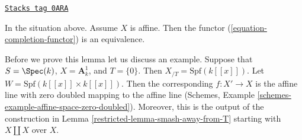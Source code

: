 \begin{lemma}
\label{restricted-lemma-dilatations-affine}
\href{https://stacks.math.columbia.edu/tag/0ARA}{\texttt{Stacks tag 0ARA}}

In the situation above. Assume $X$ is affine. Then the functor
(\ref{equation-completion-functor}) is an equivalence.
\end{lemma}

Before we prove this lemma let us discuss an example. Suppose that
$S = \Spec(k)$, $X = \mathbf{A}^1_k$, and $T = \{0\}$. Then
$X_{/T} = \text{Spf}(k[[x]])$. Let $W = \text{Spf}(k[[x]] \times k[[x]])$.
Then the corresponding $f : X' \to X$ is the affine line with zero doubled
mapping to the affine line
(Schemes, Example \ref{schemes-example-affine-space-zero-doubled}).
Moreover, this is the output of the construction in
Lemma \ref{restricted-lemma-smash-away-from-T}
starting with $X \amalg X$ over $X$.

